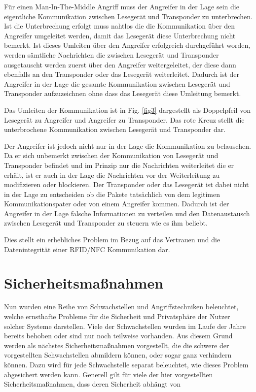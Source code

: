 \documentclass[conference]{IEEEtran}
\begin{document}
Für einen Man-In-The-Middle Angriff muss der Angreifer in der Lage sein die eigentliche Kommunikation zwischen Lesegerät und Transponder zu unterbrechen. Ist die Unterbrechung erfolgt muss nahtlos die die Kommunikation über den Angreifer umgeleitet werden, damit das Lesegerät diese Unterbrechung nicht bemerkt. Ist dieses Umleiten über den Angreifer erfolgreich durchgeführt worden, werden sämtliche Nachrichten die zwischen Lesegerät und Transponder ausgetauscht werden zuerst über den Angreifer weitergeleitet, der diese dann ebenfalls an den Transponder oder das Lesegerät weiterleitet. Dadurch ist der Angreifer in der Lage die gesamte Kommunikation zwischen Lesegerät und Transponder aufzuzeichnen ohne dass das Lesegerät diese Umleitung bemerkt.

Das Umleiten der Kommunikation ist in Fig. \ref{fig3} dargestellt als Doppelpfeil von Lesegerät zu Angreifer und Angreifer zu Transponder. Das rote Kreuz stellt die unterbrochene Kommunikation zwischen Lesegerät und Transponder dar.

Der Angreifer ist jedoch nicht nur in der Lage die Kommunikation zu belauschen. Da er sich unbemerkt zwischen der Kommunikation von Lesegerät und Transponder befindet und im Prinzip nur die Nachrichten weiterleitet die er erhält, ist er auch in der Lage die Nachrichten vor der Weiterleitung zu modifizieren oder blockieren. Der Transponder oder das Lesegerät ist dabei nicht in der Lage zu entscheiden ob die Pakete tatsächlich von dem legitimen Kommunikationspater oder von einem Angreifer kommen. Dadurch ist der Angreifer in der Lage falsche Informationen zu verteilen und den Datenaustausch zwischen Lesegerät und Transponder zu steuern wie es ihm beliebt.

Dies stellt ein erhebliches Problem im Bezug auf das Vertrauen und die Datenintegrität einer RFID/NFC Kommunikation dar.


\section{Sicherheitsmaßnahmen}
Nun wurden eine Reihe von Schwachstellen und Angriffstechniken beleuchtet, welche ernsthafte Probleme für die Sicherheit und Privatsphäre der Nutzer solcher Systeme darstellen. Viele der Schwachstellen wurden im Laufe der Jahre bereits behoben oder sind nur noch teilweise vorhanden. Aus diesem Grund werden als nächstes Sicherheitsmaßnahmen vorgestellt, die die schwere der vorgestellten Schwachstellen abmildern können, oder sogar ganz verhindern können. Dazu wird für jede Schwachstelle separat beleuchtet, wie dieses Problem abgesichert werden kann. Generell gilt für viele der hier vorgestellten Sicherheitsmaßnahmen, dass deren Sicherheit abhängt von 
\end{document}
